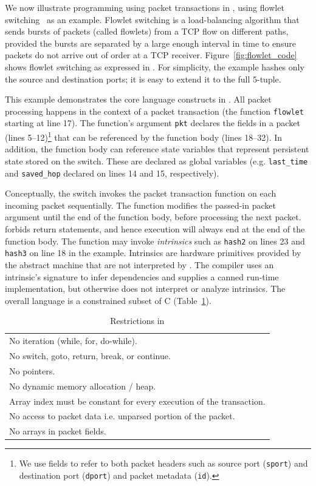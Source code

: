 We now illustrate programming using packet transactions in \pktlanguage, using
flowlet switching~\cite{flowlets} as an example. Flowlet switching is a
load-balancing algorithm that sends bursts of packets (called flowlets) from a
TCP flow on different paths, provided the bursts are separated by a large
enough interval in time to ensure packets do not arrive out of order at a TCP
receiver. Figure~\ref{fig:flowlet_code} shows flowlet switching as expressed in
\pktlanguage. For simplicity, the example hashes only the source and
destination ports; it is easy to extend it to the full 5-tuple.

This example demonstrates the core language constructs in \pktlanguage. All
packet processing happens in the context of a packet transaction (the function
\texttt{flowlet} starting at line 17). The function's argument {\tt pkt}
declares the fields in a packet (lines 5--12)\footnote{We use fields to refer
to both packet headers such as source port ({\tt sport}) and destination port
({\tt dport}) and packet metadata ({\tt id}).} that can be referenced by the
function body (lines 18--32).  In addition, the function body can reference
state variables that represent persistent state stored on the switch. These are
declared as global variables (e.g. \texttt{last\_time} and \texttt{saved\_hop}
declared on lines 14 and 15, respectively).

Conceptually, the switch invokes the packet transaction function on each
incoming packet sequentially. The function modifies the passed-in packet
argument until the end of the function body, before processing the next packet.
\pktlanguage forbids return statements, and hence execution will always end at
the end of the function body. The function may invoke \textit{intrinsics} such
as \texttt{hash2} on lines 23 and \texttt{hash3} on line 18 in the example.
Intrinsics are hardware primitives provided by the abstract machine that are
not interpreted by \pktlanguage. The \pktlanguage compiler uses an intrinsic's
signature to infer dependencies and supplies a canned run-time implementation,
but otherwise does not interpret or analyze intrinsics. The overall language is
a constrained subset of C (Table~\ref{tab:restrict}).
\begin{table}
  \begin{tabular}{p{}}
    No iteration (while, for, do-while).\\
    No switch, goto, return, break, or continue.\\
    No pointers.\\
    No dynamic memory allocation / heap.\\
    Array index must be constant for every execution of the transaction.\\
    No access to packet data i.e. unparsed portion of the packet.\\
    No arrays in packet fields.\\
  \end{tabular}
  \caption{Restrictions in \pktlanguage}
  \label{tab:restrict}
\end{table}

